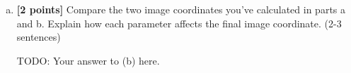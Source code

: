\begin{enumerate}[(a)]
\begin{enumerate} [(i)]
\item A camera with focal length in both $x$ and $y$ directions of $2$, a translation of $5$ along the x-axis, and no skew or rotation.
\begin{mdframed}
TODO: Fill in the \_\_
\begin{align*}
    \begin{pmatrix} 
    \_\_ & \_\_ & $0$ \\ 
    $0$ & \_\_ & $0$ \\ 
    $0$ & $0$ & $1$ 
    \end{pmatrix} *
    \begin{pmatrix} 
    \_\_ & \_\_ & \_\_ & \_\_ \\ 
    \_\_ & \_\_ & \_\_ & \_\_ \\ 
    \_\_ & \_\_ & \_\_ & \_\_ 
    \end{pmatrix} 
    \times
    \begin{pmatrix} 
    $30$ \\ 
    $-20$ \\ 
    $10$ \\ 
    $1$ 
    \end{pmatrix}
    = \begin{pmatrix}  
    \_\_ \\ 
    \_\_ \\ 
    \_\_ 
    \end{pmatrix}
    = \_\_ * 
    \begin{pmatrix}  
    \_\_ \\ 
    \_\_ \\ 
    $1$ 
    \end{pmatrix}
\end{align*}
\end{mdframed}

\end{enumerate}
\item \textbf{[2 points]} Compare the two image coordinates you've calculated in parts a and b. Explain how each parameter affects the final image coordinate. (2-3 sentences)

\begin{mdframed}
TODO: Your answer to (b) here.
\end{mdframed}



\end{enumerate}
